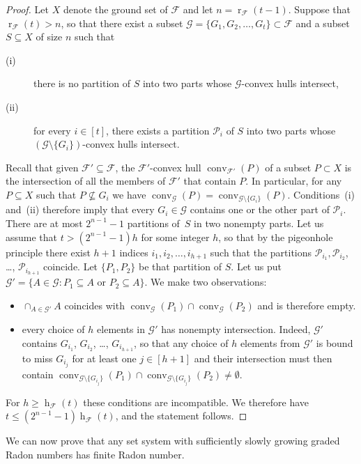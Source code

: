 \documentclass[11pt]{article}
\newcommand{\p}{\mathcal{P}}
\newcommand{\F}{\mathcal{F}}
\newcommand{\G}{\mathcal{G}}
\DeclareMathOperator{\h}{h}
\DeclareMathOperator{\conv}{conv}
\DeclareMathOperator{\rad}{r}
\begin{document}
\begin{proof}
  Let $X$ denote the ground set of $\F$ and let $n = \rad_\F(t-1)$. Suppose that $\rad_\F(t)>n$, so that there exist a subset $\G = \{G_1,G_2, \ldots, G_t\} \subset \F$ and a subset $S \subseteq X$ of size $n$ such that
%
\begin{description}
\item[(i)] there is no partition of $S$ into two parts whose $\G$-convex hulls intersect,\medskip
\item[(ii)] for every $i \in [t]$, there exists a partition $\p_i$ of $S$ into two parts whose $(\G\setminus \{G_i\})$-convex hulls intersect.
\end{description}
%
\noindent
Recall that given $\F' \subseteq \F$, the $\F'$-convex hull $\conv_{\F'}(P)$ of a subset $P\subset X$ is the intersection of all the members of $\F'$ that contain $P$. In particular, for any $P \subseteq X$ such that $P \not \subseteq G_{i}$ we have $\conv_\G(P) = \conv_{\G\setminus \{G_{i}\}}(P)$. Conditions~(i) and~(ii) therefore imply that every $G_i \in \G$ contains one or the other part of $\p_i$.
%
\medskip
%
There are at most $2^{n-1}-1$ partitions of~$S$ in two nonempty parts. Let us assume that $t > (2^{n-1}-1)h$ for some integer $h$, so that by the pigeonhole principle there exist $h+1$ indices $i_1,i_2, \ldots, i_{h+1}$ such that the partitions $\p_{i_1}, \p_{i_2}$, \ldots, $\p_{i_{h+1}}$ coincide. Let $\{P_1,P_2\}$ be that partition of $S$. Let us put $\G' = \{ A \in \G \colon P_1 \subseteq A \text{ or } P_2 \subseteq A\}$. We make two observations:
%
\begin{itemize}
\item $\cap_{A \in \G'}A$ coincides with $\conv_{\G}(P_1) \cap \conv_{\G}(P_2)$ and is therefore empty.\medskip
\item every choice of $h$ elements in $\G'$ has nonempty intersection. Indeed, $\G'$ contains $G_{i_1}$, $G_{i_2}$, \ldots, $G_{i_{h+1}}$, so that any choice of $h$ elements from $\G'$ is bound to miss $G_{i_j}$ for at least one $j \in [h+1]$ and their intersection must then contain $\conv_{\G \setminus \{G_{i_j}\}}(P_1) \cap \conv_{\G \setminus \{G_{i_j}\}}(P_2) \neq \emptyset$. 
\end{itemize}
%
\noindent
For $h \ge \h_\F(t)$ these conditions are incompatible. We therefore have $t \le (2^{n-1}-1) \h_\F(t)$, and the statement follows.
\end{proof}
%
%
We can now prove that any set system with sufficiently slowly growing graded Radon numbers has finite Radon number.
\end{document}

